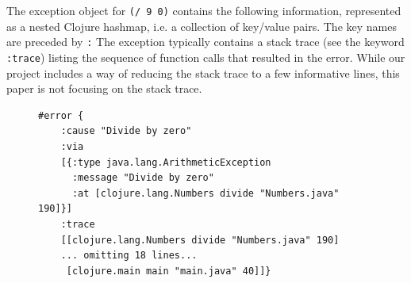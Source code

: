 \documentclass[12pt]{article}
\begin{document}
The exception object for \texttt{(/ 9 0)} contains the following information, represented as a nested Clojure hashmap, 
i.e. a collection of key/value pairs. The key names are preceded by \texttt{:} The exception typically contains a stack trace (see the keyword \texttt{:trace}) listing the sequence of function calls that resulted in the error. While our project includes a way of reducing the stack trace to a few informative lines, this paper is not focusing on the stack trace. 
	\begin{figure}[h]
		\centering
		\begin{lstlisting}[breaklines=true, basicstyle=\ttfamily]
#error {
	:cause "Divide by zero"
	:via
	[{:type java.lang.ArithmeticException
	  :message "Divide by zero"
	  :at [clojure.lang.Numbers divide "Numbers.java" 190]}]
	:trace
	[[clojure.lang.Numbers divide "Numbers.java" 190]
	... omitting 18 lines...
	 [clojure.main main "main.java" 40]]}

		\end{lstlisting}
	\end{figure}
	
\end{document}
